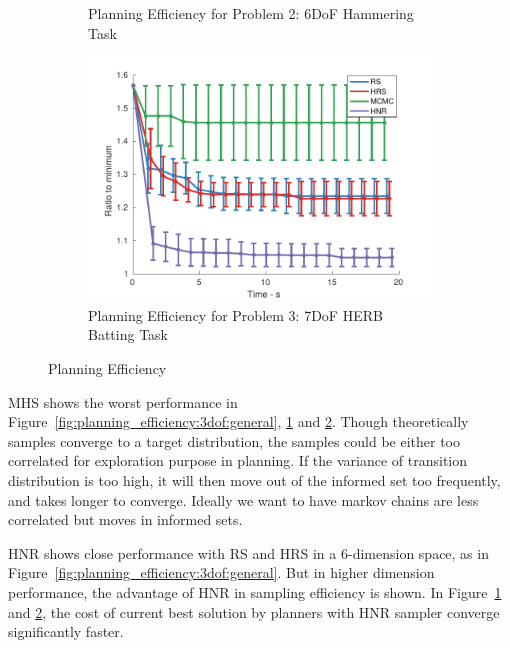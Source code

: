 \documentclass[letterpaper, 10 pt, conference]{ieeeconf}  %
\begin{document}
\begin{figure}[t!]
\begin{subfigure}[b]{0.32\textwidth}
		\caption{\captionstyle Planning Efficiency for Problem 2: 6DoF Hammering Task}
		\label{fig:planning_efficiency:6dof:hammering}
	\end{subfigure}
	\begin{subfigure}[b]{0.32\textwidth}
	\includegraphics[width=\linewidth]{fig/planning_efficiency/herb_batting_efficiency}
	\caption{\captionstyle Planning Efficiency for Problem 3: 7DoF HERB Batting Task}
	\label{fig:planning_efficiency:herb:batting}
    \end{subfigure}
	\caption{Planning Efficiency}
	\label{fig:planning_efficiency}
\end{figure} 


MHS shows the worst performance in Figure~\ref{fig:planning_efficiency:3dof:general}, \ref{fig:planning_efficiency:6dof:hammering} and \ref{fig:planning_efficiency:herb:batting}.
Though theoretically samples converge to a target distribution, the samples could be either too correlated for exploration purpose in planning.
If the variance of transition distribution is too high, it will then move out of the informed set too frequently, and takes longer to converge.
Ideally we want to have markov chains are less correlated but moves in informed sets.

HNR shows close performance with RS and HRS in a 6-dimension space, as in Figure~\ref{fig:planning_efficiency:3dof:general}.
But in higher dimension performance, the advantage of HNR in sampling efficiency is shown.
In Figure~\ref{fig:planning_efficiency:6dof:hammering} and \ref{fig:planning_efficiency:herb:batting}, the cost of current best solution by planners with HNR sampler converge significantly faster.
\end{document}
